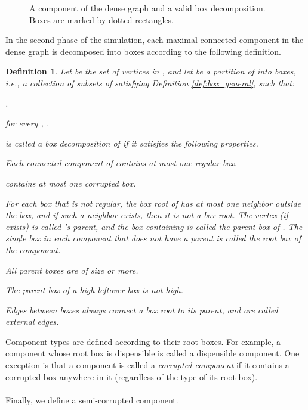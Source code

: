 \documentclass[11pt]{article}
\def\dnsitem{\vspace{-7pt}\item}
\newtheorem{definition}[theorem]{Definition}
\theoremstyle{definition}
\begin{document}
\begin{figure}[thbp]
  \caption{\sf A component of the dense graph and a valid box decomposition. Boxes are marked by dotted rectangles.}
  \medskip
  \centering
  \label{fig:box_decomp}
\end{figure}

In the second phase of the simulation, each maximal connected component  in the dense graph  is decomposed into boxes according to the following definition.
\begin{definition}
\label{def:box_decomp}
Let  be the set of vertices in , and let  be a partition of  into boxes, i.e., a collection of subsets of  satisfying Definition \ref{def:box_general}, such that:
\begin{enumerate}[(a)]
	{\setlength\itemindent{10pt} \dnsitem .}
	{\setlength\itemindent{10pt} \dnsitem  for every , .}
\end{enumerate}
 is called a \emph{box decomposition} of  if it satisfies the following properties.
\begin{description}
	\dnsitem[.] Each connected component of  contains at most one regular box.
	\dnsitem[.]  contains at most one corrupted box.
	\dnsitem[.] For each box  that is not regular, the box root  of  has at most one neighbor outside the box, and if such a neighbor  exists, then it is not a box root.
	The vertex  (if exists) is called 's \emph{parent}, and the box  containing  is called the \emph{parent box} of . 
	The single box in each component that does not have a parent is called the \emph{root box} of the component.
	\dnsitem[.] All parent boxes are of size  or more. 
	\dnsitem[.] The parent box of a high leftover box is not high.
	\dnsitem[.] Edges between boxes always connect a box root to its parent, and are called \emph{external edges}.  
\end{description}

\end{definition}

Component types are defined according to their root boxes. 
For example, a component whose root box is dispensible is called a dispensible component. 
One exception is that a component is called a \emph{corrupted component} if it contains a corrupted box anywhere in it (regardless of the type of its root box).

\paragraph{}
Finally, we define a semi-corrupted component.
\end{document}
